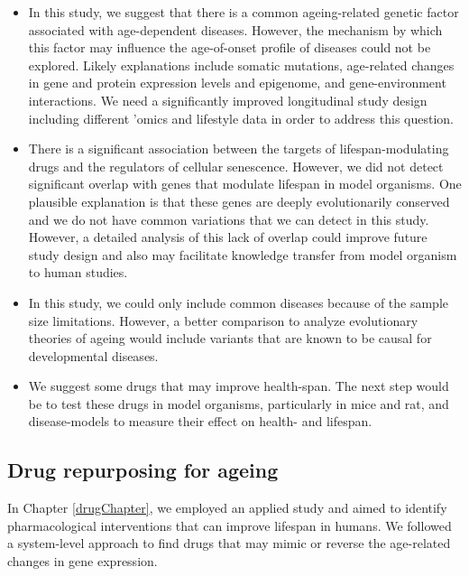 \documentclass[12pt,twoside]{unicam}
\providecommand{\tightlist}{%
  \setlength{\itemsep}{0pt}\setlength{\parskip}{0pt}}
\begin{document}
\begin{itemize}
\tightlist
\item
  In this study, we suggest that there is a common ageing-related genetic factor associated with age-dependent diseases. However, the mechanism by which this factor may influence the age-of-onset profile of diseases could not be explored. Likely explanations include somatic mutations, age-related changes in gene and protein expression levels and epigenome, and gene-environment interactions. We need a significantly improved longitudinal study design including different 'omics and lifestyle data in order to address this question.
\item
  There is a significant association between the targets of lifespan-modulating drugs and the regulators of cellular senescence. However, we did not detect significant overlap with genes that modulate lifespan in model organisms. One plausible explanation is that these genes are deeply evolutionarily conserved and we do not have common variations that we can detect in this study. However, a detailed analysis of this lack of overlap could improve future study design and also may facilitate knowledge transfer from model organism to human studies.
\item
  In this study, we could only include common diseases because of the sample size limitations. However, a better comparison to analyze evolutionary theories of ageing would include variants that are known to be causal for developmental diseases.
\item
  We suggest some drugs that may improve health-span. The next step would be to test these drugs in model organisms, particularly in mice and rat, and disease-models to measure their effect on health- and lifespan.
\end{itemize}

\hypertarget{drug-repurposing-for-ageing}{%
\subsection{Drug repurposing for ageing}\label{drug-repurposing-for-ageing}}

In Chapter \ref{drugChapter}, we employed an applied study and aimed to identify pharmacological interventions that can improve lifespan in humans. We followed a system-level approach to find drugs that may mimic or reverse the age-related changes in gene expression.
\end{document}
